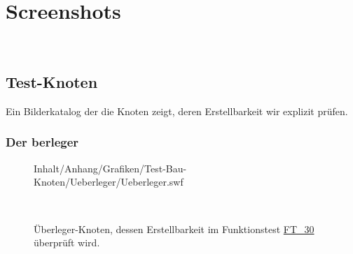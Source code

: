 %



\section{Screenshots}
\label{Anhang:Aufnahmen}


~\\



\newpage




\subsection{Test-Knoten}

Ein Bilderkatalog der die Knoten zeigt, deren Erstellbarkeit wir explizit prüfen.\\

	\subsubsection*{Der berleger\grqq}
	
	
		\begin{figure}[!h]
		
			\label{Abb:Test-Bau-Knoten:Ueberleger}
			\centering	
			
			{Inhalt/Anhang/Grafiken/Test-Bau-Knoten/Ueberleger/Ueberleger.swf}
			
			~\\
	
			\caption{Überleger-Knoten, dessen Erstellbarkeit im Funktionstest \hyperref[FT:30:2]{FT\_30} überprüft wird.}
	
		\end{figure}
		
